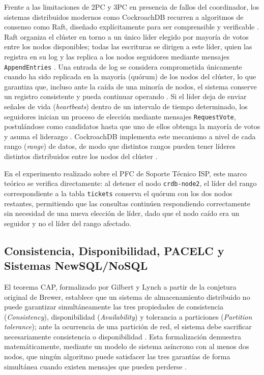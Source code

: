 \documentclass[12pt, a4paper]{article}
\begin{document}
Frente a las limitaciones de 2PC y 3PC en presencia de fallos del coordinador, los sistemas distribuidos modernos como CockroachDB recurren a algoritmos de consenso como Raft, diseñado explícitamente para ser comprensible y verificable \cite{ongaro2014raft}. Raft organiza el clúster en torno a un único líder elegido por mayoría de votos entre los nodos disponibles; todas las escrituras se dirigen a este líder, quien las registra en su log y las replica a los nodos seguidores mediante mensajes \texttt{AppendEntries} \cite{ongaro2014raft}. Una entrada de log se considera comprometida únicamente cuando ha sido replicada en la mayoría (quórum) de los nodos del clúster, lo que garantiza que, incluso ante la caída de una minoría de nodos, el sistema conserve un registro consistente y pueda continuar operando \cite{ongaro2014raft}. Si el líder deja de enviar señales de vida (\textit{heartbeats}) dentro de un intervalo de tiempo determinado, los seguidores inician un proceso de elección mediante mensajes \texttt{RequestVote}, postulándose como candidatos hasta que uno de ellos obtenga la mayoría de votos y asuma el liderazgo \cite{ongaro2014raft}. CockroachDB implementa este mecanismo a nivel de cada rango (\textit{range}) de datos, de modo que distintos rangos pueden tener líderes distintos distribuidos entre los nodos del clúster \cite{taft2020cockroachdb}.

En el experimento realizado sobre el PFC de Soporte Técnico ISP, este marco teórico se verifica directamente: al detener el nodo \texttt{crdb-node2}, el líder del rango correspondiente a la tabla \texttt{tickets} conserva el quórum con los dos nodos restantes, permitiendo que las consultas continúen respondiendo correctamente sin necesidad de una nueva elección de líder, dado que el nodo caído era un seguidor y no el líder del rango afectado.

\subsection{Consistencia, Disponibilidad, PACELC y Sistemas NewSQL/NoSQL}

El teorema CAP, formalizado por Gilbert y Lynch a partir de la conjetura original de Brewer, establece que un sistema de almacenamiento distribuido no puede garantizar simultáneamente las tres propiedades de consistencia (\textit{Consistency}), disponibilidad (\textit{Availability}) y tolerancia a particiones (\textit{Partition tolerance}); ante la ocurrencia de una partición de red, el sistema debe sacrificar necesariamente consistencia o disponibilidad \cite{gilbert2002brewer}. Esta formalización demuestra matemáticamente, mediante un modelo de sistema asíncrono con al menos dos nodos, que ningún algoritmo puede satisfacer las tres garantías de forma simultánea cuando existen mensajes que pueden perderse \cite{gilbert2002brewer}.
\end{document}
